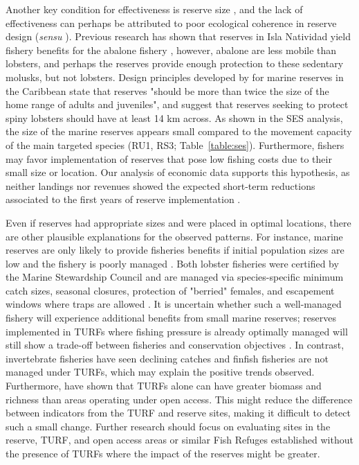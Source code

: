 \documentclass[10pt,letterpaper]{article}
\begin{document}
Another key condition for effectiveness is reserve size \cite{edgar_2014-UO}, and the lack of effectiveness can perhaps be attributed to poor ecological coherence in reserve design (\emph{sensu} \cite{rees_2018}). Previous research has shown that reserves in Isla Natividad yield fishery benefits for the abalone fishery \cite{rossetto_2015-V0}, however, abalone are less mobile than lobsters, and perhaps the reserves provide enough protection to these sedentary molusks, but not lobsters. Design principles developed by \cite{green_2017} for marine reserves in the Caribbean state that reserves "should be more than twice the size of the home range of adults and juveniles", and suggest that reserves seeking to protect spiny lobsters should have at least 14 km across. As shown in the SES analysis, the size of the marine reserves appears small compared to the movement capacity of the main targeted species (RU1, RS3; Table~\ref{table:ses}). Furthermore, fishers may favor implementation of reserves that pose low fishing costs due to their small size or location. Our analysis of economic data supports this hypothesis, as neither landings nor revenues showed the expected short-term reductions associated to the first years of reserve implementation \cite{ovando_2016-Wg}.

Even if reserves had appropriate sizes and were placed in optimal locations, there are other plausible explanations for the observed patterns. For instance, marine reserves are only likely to provide fisheries benefits if initial population sizes are low and the fishery is poorly managed \cite{hilborn_2004,hilborn_2006}. Both lobster fisheries were certified by the Marine Stewardship Council and are managed via species-specific minimum catch sizes, seasonal closures, protection of "berried" females, and escapement windows where traps are allowed \cite{dof_website_1993}. It is uncertain whether such a well-managed fishery will experience additional benefits from small marine reserves; reserves implemented in TURFs where fishing pressure is already optimally managed will still show a trade-off between fisheries and conservation objectives \cite{lester_2017}. In contrast, invertebrate fisheries have seen declining catches and finfish fisheries are not managed under TURFs, which may explain the positive trends observed. Furthermore, \cite{gelcich_2008} have shown that TURFs alone can have greater biomass and richness than areas operating under open access. This might reduce the difference between indicators from the TURF and reserve sites, making it difficult to detect such a small change. Further research should focus on evaluating sites in the reserve, TURF, and open access areas or similar Fish Refuges established without the presence of TURFs where the impact of the reserves might be greater.
\end{document}
